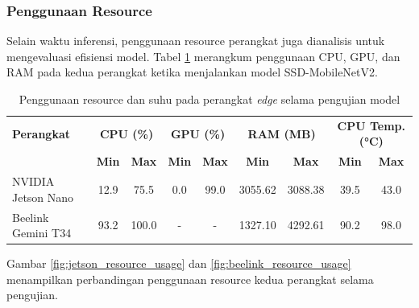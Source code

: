 
\subsubsection{Penggunaan Resource}

Selain waktu inferensi, penggunaan resource perangkat juga dianalisis untuk mengevaluasi efisiensi model. Tabel \ref{tab:resource_usage} merangkum penggunaan CPU, GPU, dan RAM pada kedua perangkat ketika menjalankan model SSD-MobileNetV2.

\begin{table}[htbp]
  \centering
  \caption{Penggunaan resource dan suhu pada perangkat \emph{edge} selama pengujian model}
  \label{tab:resource_usage}
  \setlength{\tabcolsep}{3pt}
  \begin{tabular}{|l|c|c|c|c|c|c|c|c|}
  \hline
  \rowcolor[HTML]{C0C0C0}
  \textbf{Perangkat} & \multicolumn{2}{c|}{\textbf{CPU (\%)}} & \multicolumn{2}{c|}{\textbf{GPU (\%)}} & \multicolumn{2}{c|}{\textbf{RAM (MB)}} & \multicolumn{2}{c|}{\textbf{CPU Temp. (°C)}} \\
  \cline{2-9}
  \rowcolor[HTML]{C0C0C0}
  & \textbf{Min} & \textbf{Max} & \textbf{Min} & \textbf{Max} & \textbf{Min} & \textbf{Max} & \textbf{Min} & \textbf{Max} \\
  \hline
  NVIDIA Jetson Nano & 12.9 & 75.5 & 0.0 & 99.0 & 3055.62 & 3088.38 & 39.5 & 43.0 \\
  \hline
  Beelink Gemini T34 & 93.2 & 100.0 & - & - & 1327.10 & 4292.61 & 90.2 & 98.0 \\
  \hline
  \end{tabular}
\end{table}

Gambar \ref{fig:jetson_resource_usage} dan \ref{fig:beelink_resource_usage} menampilkan perbandingan penggunaan resource kedua perangkat selama pengujian.

